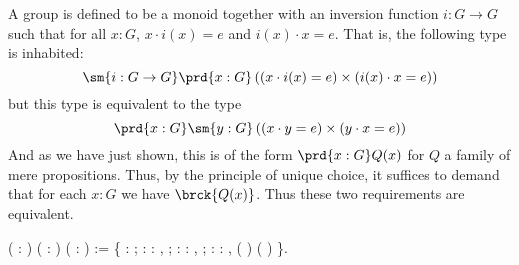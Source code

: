 A group is defined to be a monoid together with an inversion function $i : G
\to G$ such that for all $x : G$, $x \cdot i(x) = e$ and $i(x) \cdot x = e$.
That is, the following type is inhabited:
\[
  \sm{i : G \to G}\prd{x : G}\left(
    (x \cdot i(x) = e) \times (i(x) \cdot x = e)
  \right)
\]
but this type is equivalent to the type
\[
  \prd{x : G}\sm{y : G}
  \left(
    (x \cdot y = e) \times (y \cdot x = e)
  \right)
\]
And as we have just shown, this is of the form $\prd{x:G} Q(x)$ for $Q$ a
family of mere propositions.  Thus, by the principle of unique choice, it
suffices to demand that for each $x : G$ we have $\brck{Q(x)}$.  Thus these two
requirements are equivalent.
\begin{coqdoccode}
\coqdocemptyline
\coqdocnoindent
{}  ( : ) ( :     ) ( : ) \coqdoceol
\coqdocindent{1.00em}
:=  \{\coqdoceol
\coqdocindent{4.50em}
 :   ;\coqdoceol
\coqdocindent{4.50em}
 : \coqdockw{\ensuremath{\forall}}  : ,    \coqdocnotation{=}  ;\coqdoceol
\coqdocindent{4.50em}
 : \coqdockw{\ensuremath{\forall}}  : ,    \coqdocnotation{=}  ;\coqdoceol
\coqdocindent{4.50em}
 : \coqdockw{\ensuremath{\forall}}    : ,   (  ) \coqdocnotation{=}  (  ) \coqdoceol
\coqdocindent{3.50em}
\}.\coqdoceol
\coqdocemptyline
\coqdocnoindent
{}  \coqdoceol

\end{coqdoccode}

